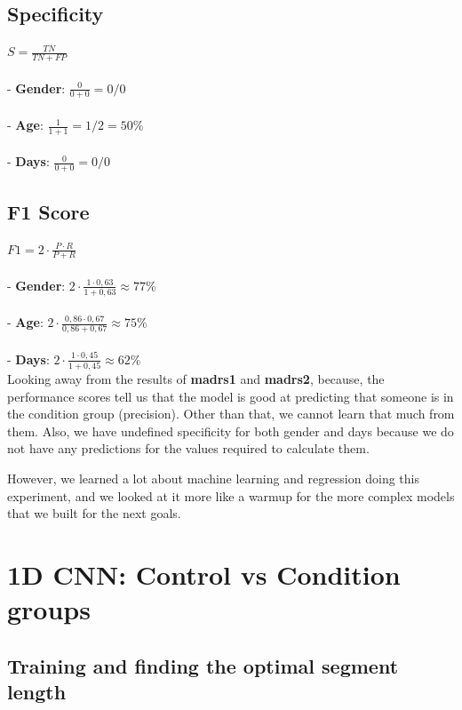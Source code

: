 \begin{multicols}{2}
\subsection{Specificity}
$ S = \frac{TN}{TN+FP} $
\\\\
- \textbf{Gender}: $\frac{0}{0+0} = 0/0$\\\\
- \textbf{Age}: $\frac{1}{1+1} = 1/2 = 50\%$\\\\
- \textbf{Days}: $\frac{0}{0+0} = 0/0$\\

\end{multicols}

\subsection{F1 Score}
$ F1 = 2 \cdot \frac{P \cdot R}{P + R} $
\\\\
- \textbf{Gender}: $2 \cdot \frac{1 \cdot 0,63}{1 + 0,63} \approx 77\%$\\\\
- \textbf{Age}: $2 \cdot \frac{0,86 \cdot 0,67}{0,86 + 0,67} \approx 75\%$\\\\
- \textbf{Days}: $2 \cdot \frac{1 \cdot 0,45}{1 + 0,45} \approx 62\%$\\

Looking away from the results of \textbf{madrs1} and \textbf{madrs2}, because, the performance scores tell us that the model is good at predicting that someone is in the condition group (precision). Other than that, we cannot learn that much from them. Also, we have undefined specificity for both gender and days because we do not have any predictions for the values required to calculate them. 

However, we learned a lot about machine learning and regression doing this experiment, and we looked at it more like a warmup for the more complex models that we built for the next goals.

\section{1D CNN: Control vs Condition groups}

\subsection{Training and finding the optimal segment length}

